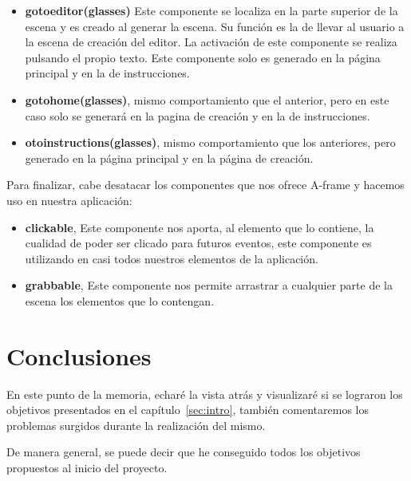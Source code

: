 \documentclass[a4paper, 12pt]{book}
\begin{document}
\begin{itemize}
    \item \textbf{gotoeditor(glasses)} Este componente se localiza en la parte superior de la escena y es creado al generar la escena. Su función es la de llevar al usuario a la escena de creación del editor. La activación de este componente se realiza pulsando el propio texto. Este componente solo es generado en la página principal y en la de instrucciones.
    
    \item \textbf{gotohome(glasses)}, mismo comportamiento que el anterior, pero en este caso solo se generará en la pagina de creación y en la de instrucciones.
    
    \item \textbf{otoinstructions(glasses)}, mismo comportamiento que los anteriores, pero generado en la página principal y en la página de creación.
\end{itemize}

Para finalizar, cabe desatacar los componentes que nos ofrece A-frame y hacemos uso en nuestra aplicación:
\begin{itemize}
    \item \textbf{clickable}, Este componente nos aporta, al elemento que lo contiene, la cualidad de poder ser clicado para futuros eventos, este componente es utilizando en casi todos nuestros elementos de la aplicación.
    \item \textbf{grabbable}, Este componente nos permite arrastrar a cualquier parte de la escena los elementos que lo contengan. 
\end{itemize}


\cleardoublepage
\chapter{Conclusiones}
\label{chap:conclusiones}
En este punto de la memoria, echaré la vista atrás y visualizaré si se lograron los objetivos presentados en el capítulo~\ref{sec:intro}, también comentaremos los problemas surgidos durante la realización del mismo.

De manera general, se puede decir que he conseguido todos los objetivos propuestos al inicio del proyecto.
\end{document}
